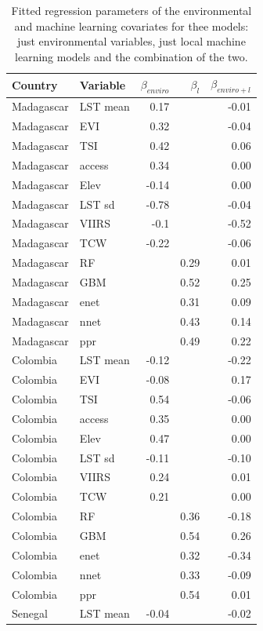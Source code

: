 \documentclass[review]{elsarticle}
\begin{document}
\begin{table}
\caption{Fitted regression parameters of the environmental and machine learning covariates for thee models: just environmental variables, just local machine learning models and the combination of the two.}
\centering
\tiny
\begin{tabular}{ll|rrr}
Country    & Variable &  $\beta_{enviro}$   & $\beta_l$ & $\beta_{enviro+l}$\\ \hline
Madagascar & LST mean & 0.17 &  &  -0.01\\
Madagascar & EVI & 0.32 &  & -0.04 \\
Madagascar & TSI & 0.42 &  &0.06  \\
Madagascar & access & 0.34 &  &0.00  \\
Madagascar & Elev & -0.14 &  & 0.00\\ 
Madagascar & LST sd & -0.78 &  &-0.04  \\
Madagascar & VIIRS & -0.1 &  &-0.52  \\
Madagascar & TCW & -0.22 &  & -0.06\\ 
Madagascar & RF &  & 0.29 &  0.01\\
Madagascar & GBM &  & 0.52 & 0.25 \\
Madagascar & enet &  & 0.31 &0.09  \\
Madagascar & nnet &  & 0.43 &0.14  \\
Madagascar & ppr &  & 0.49 & 0.22\vspace{0.2cm}\\ 
Colombia & LST mean &-0.12  &  & -0.22\\
Colombia & EVI &  -0.08&  & 0.17\\
Colombia & TSI &  0.54&  & -0.06\\
Colombia & access &  0.35&  &0.00 \\
Colombia & Elev &  0.47&  & 0.00\\
Colombia & LST sd & -0.11 &  & -0.10\\
Colombia & VIIRS & 0.24 &  & 0.01\\
Colombia & TCW &  0.21&  & 0.00\\
Colombia & RF &  & 0.36 & -0.18\\
Colombia & GBM &  & 0.54 & 0.26\\
Colombia & enet &  & 0.32 & -0.34\\
Colombia & nnet &  &0.33  & -0.09\\
Colombia & ppr &  & 0.54 & 0.01\vspace{0.2cm}\\
Senegal & LST mean &-0.04  &  &-0.02\\

\end{tabular}
\end{table}
\end{document}
